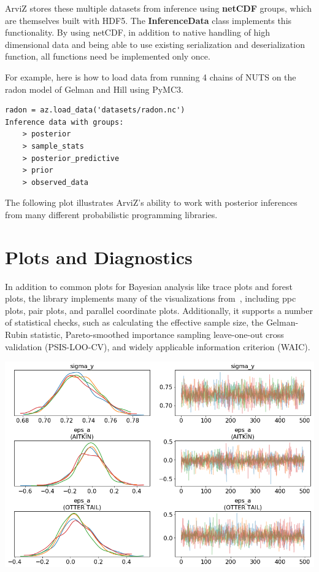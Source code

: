 \documentclass[a0,portrait]{a0poster}
\begin{document}
\begin{multicols}{3}
ArviZ stores these multiple datasets from inference using \textbf{netCDF} groups, which are themselves built with HDF5. The \textbf{InferenceData} class implements this functionality. By using netCDF, in addition to native handling of high dimensional data and being able to use existing serialization and deserialization function, all functions need be implemented only once.

For example, here is how to load data from running 4 chains of NUTS on the radon model of Gelman and Hill using PyMC3.

\begin{lstlisting}
radon = az.load_data('datasets/radon.nc')
Inference data with groups:
	> posterior
	> sample_stats
	> posterior_predictive
	> prior
	> observed_data
\end{lstlisting}

The following plot illustrates ArviZ's ability to work with posterior inferences from many different probabilistic programming libraries.

\section{Plots and Diagnostics}

In addition to common plots for Bayesian analysis like trace plots and forest plots, the library implements many of the visualizations from~\cite{gabry2017visualization}, including ppc plots, pair plots, and parallel coordinate plots. Additionally, it supports a number of statistical checks, such as calculating the effective sample size, the Gelman-Rubin statistic, Pareto-smoothed importance sampling leave-one-out cross validation (PSIS-LOO-CV), and widely applicable information criterion (WAIC).

\begin{center}\vspace{1cm}
\includegraphics[width=1.0\linewidth]{figures/plot_trace}
\end{center}


\end{multicols}
\end{document}
